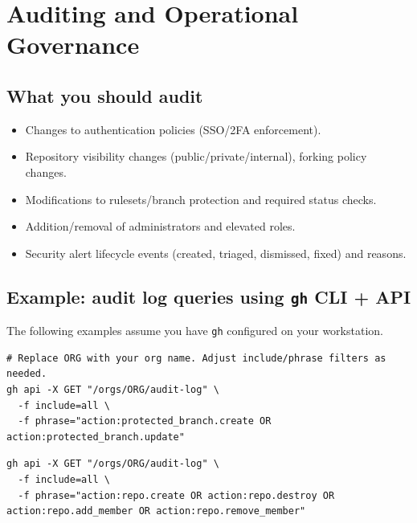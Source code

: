 \documentclass[11pt]{article}
\begin{document}
\section{Auditing and Operational Governance}

\subsection{What you should audit}
\begin{itemize}[leftmargin=*,itemsep=2pt]
  \item Changes to authentication policies (SSO/2FA enforcement).
  \item Repository visibility changes (public/private/internal), forking policy changes.
  \item Modifications to rulesets/branch protection and required status checks.
  \item Addition/removal of administrators and elevated roles.
  \item Security alert lifecycle events (created, triaged, dismissed, fixed) and reasons.
\end{itemize}

\subsection{Example: audit log queries using \texttt{gh} CLI + API}
The following examples assume you have \texttt{gh} configured on your workstation.

\begin{examplebox}[title={Example: Retrieve organization audit log (illustrative)}]
\begin{verbatim}
# Replace ORG with your org name. Adjust include/phrase filters as needed.
gh api -X GET "/orgs/ORG/audit-log" \
  -f include=all \
  -f phrase="action:protected_branch.create OR action:protected_branch.update"
\end{verbatim}
\end{examplebox}

\begin{examplebox}[title={Example: Monitor changes to repository visibility or permissions (illustrative)}]
\begin{verbatim}
gh api -X GET "/orgs/ORG/audit-log" \
  -f include=all \
  -f phrase="action:repo.create OR action:repo.destroy OR action:repo.add_member OR action:repo.remove_member"
\end{verbatim}
\end{examplebox}
\end{document}
